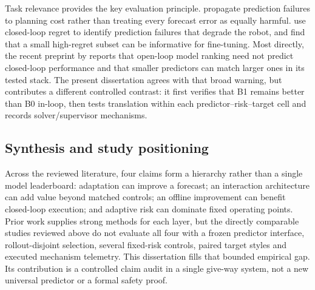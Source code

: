 Task relevance provides the key evaluation principle. \citet{farid2023task}
propagate prediction failures to planning cost rather than treating every
forecast error as equally harmful. \citet{nakamura2025regret} use closed-loop
regret to identify prediction failures that degrade the robot, and find that a
small high-regret subset can be informative for fine-tuning. Most directly,
the recent preprint by \citet{bouzidi2025closing} reports that open-loop model
ranking need not predict closed-loop performance and that smaller predictors
can match larger ones in its tested stack. The present dissertation agrees with
that broad warning, but contributes a different controlled contrast: it first
verifies that B1 remains better than B0 in-loop, then tests translation within
each predictor--risk--target cell and records solver/supervisor mechanisms.

\subsection{Synthesis and study positioning}

Across the reviewed literature, four claims form a hierarchy rather than a
single model leaderboard: adaptation can improve a forecast; an interaction
architecture can add value beyond matched controls; an offline improvement can
benefit closed-loop execution; and adaptive risk can dominate fixed operating
points. Prior work supplies strong methods for each layer, but the directly
comparable studies reviewed above do not evaluate all four with a frozen
predictor interface, rollout-disjoint selection, several fixed-risk controls,
paired target styles and executed mechanism telemetry. This dissertation fills
that bounded empirical gap. Its contribution is a controlled claim audit in a
single give-way system, not a new universal predictor or a formal safety proof.
